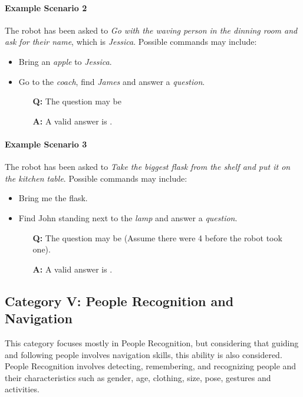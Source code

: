 \paragraph{Example Scenario 2}
The robot has been asked to \textit{Go with the waving person in the dinning room and ask for their name}, which is \textit{Jessica}. Possible commands may include:

\begin{itemize}
	\item Bring an \textit{apple} to \textit{Jessica}.
	\item Go to the \textit{coach}, find \textit{James} and answer a \textit{question}.
	\begin{itemize} 
		\item[\textbf{Q:}] The question may be 
		\item[\textbf{A:}] A valid answer is .
	\end{itemize}
\end{itemize}

\paragraph{Example Scenario 3}
The robot has been asked to \textit{Take the biggest flask from the shelf and put it on the kitchen table}. Possible commands may include:

\begin{itemize}
	\item Bring me the flask.
	\item Find John standing next to the \textit{lamp} and answer a \textit{question}.
	\begin{itemize} 
		\item[\textbf{Q:}] The question may be  (Assume there were 4 before the robot took one).
		\item[\textbf{A:}] A valid answer is .
	\end{itemize}
\end{itemize}

%
%
\subsection{Category V: People Recognition and Navigation}
\label{sec:eegpsr-categoryV-explained}
This category focuses mostly in People Recognition, but considering that guiding and following people involves navigation skills, this ability is also considered. People Recognition involves detecting, remembering, and recognizing people and their characteristics such as gender, age, clothing, size, pose, gestures and activities.

